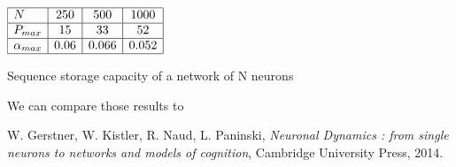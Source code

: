 \begin{table}[h]\label{capaseq}
\begin{center}
\begin{math}
    \begin{array}{|l|c|c|c|}
    \hline
    N & 250 & 500 & 1000 \\ \hline
    P_{max} & 15 & 33 & 52 \\ \hline
    \alpha_{max}& 0.06 & 0.066 & 0.052\\ \hline
    \end{array}
\end{math}
\end{center}
\caption{Sequence storage capacity  of a network of N neurons}
\end{table}
 We can compare those results to 


\begin{thebibliography}{}
 W. Gerstner, W. Kistler, R. Naud, L. Paninski, \textit{Neuronal Dynamics : from single neurons to networks and models of cognition}, Cambridge University Press, 2014.
\end{thebibliography}
